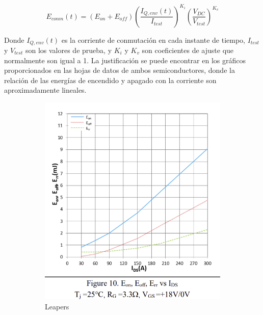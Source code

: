 \begin{equation}
E_{conm}(t) = (E_{on} + E_{off}) \left( \frac{I_{Q,env}(t)}{I_{test}} \right)^{K_i} \left( \frac{V_{DC}}{V_{test}} \right)^{K_v}
\end{equation}

Donde \(I_{Q,env}(t)\) es la corriente de conmutación en cada instante de tiempo, \(I_{test}\) y \(V_{test}\) son los valores de prueba, y \(K_i\) y \(K_v\) son coeficientes de ajuste que normalmente son igual a 1. La justificación se puede encontrar en los gráficos proporcionados en las hojas de datos de ambos semiconductores, donde la relación de las energías de encendido y apagado con la corriente son aproximadamente lineales.

\begin{figure}[H]
	\centering
	\begin{subfigure}[b]{0.4\linewidth}
		\centering
		\includegraphics[width=\linewidth]{fig/eoneoffleapers}
		\caption{Leapers}
	\end{subfigure}
	\hfill
	\begin{subfigure}[b]{0.55\linewidth}
		\centering

\end{subfigure}
\end{figure}
